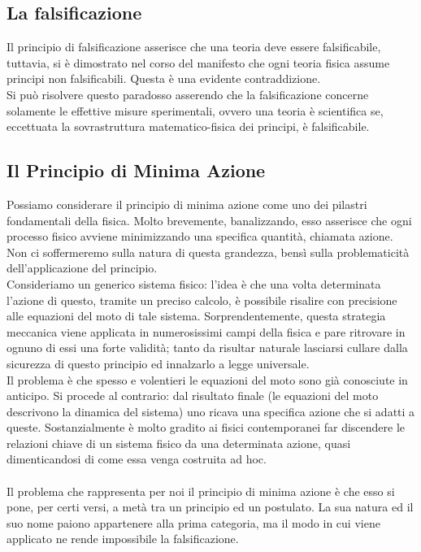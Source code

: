 \documentclass[]{article}
\begin{document}
	\subsection{La falsificazione}
	Il principio di falsificazione asserisce che una teoria deve essere falsificabile, tuttavia, si è dimostrato nel corso del manifesto che ogni teoria fisica assume principi non falsificabili. Questa è una evidente contraddizione.\\
	Si può risolvere questo paradosso asserendo che la falsificazione concerne solamente le effettive misure sperimentali, ovvero una teoria è scientifica se, eccettuata la sovrastruttura matematico-fisica dei principi, è falsificabile.
	\subsection{Il Principio di Minima Azione}
	Possiamo considerare il principio di minima azione come uno dei pilastri fondamentali della fisica. Molto brevemente, banalizzando, esso asserisce che ogni processo fisico avviene minimizzando una specifica quantità, chiamata azione. Non ci soffermeremo sulla natura di questa grandezza, bensì sulla problematicità dell'applicazione del principio.\\
	Consideriamo un generico sistema fisico: l'idea è che una volta determinata l'azione di questo, tramite un preciso calcolo, è possibile risalire con precisione alle equazioni del moto di tale sistema. Sorprendentemente, questa strategia meccanica viene applicata in numerosissimi campi della fisica e pare ritrovare in ognuno di essi una forte validità; tanto da risultar naturale lasciarsi cullare dalla sicurezza di questo principio ed innalzarlo a legge universale.\\
	Il problema è che spesso e volentieri le equazioni del moto sono già conosciute in anticipo. Si procede al contrario: dal risultato finale (le equazioni del moto descrivono la dinamica del sistema) uno ricava una specifica azione che si adatti a queste. Sostanzialmente è molto gradito ai fisici contemporanei far discendere le relazioni chiave di un sistema fisico da una determinata azione, quasi dimenticandosi di come essa venga costruita ad hoc.\\
	\\
	Il problema che rappresenta per noi il principio di minima azione è che esso si pone, per certi versi, a metà tra un principio ed un postulato. La sua natura ed il suo nome paiono appartenere alla prima categoria, ma il modo in cui viene applicato ne rende impossibile la falsificazione.
\end{document}
